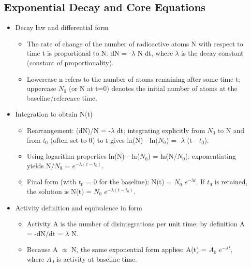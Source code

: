 \documentclass[11pt,a4paper]{article}
\let\originalsubsection\subsection
\renewcommand{\subsection}{\Needspace{8\baselineskip}\originalsubsection}
\begin{document}
\subsection{Exponential Decay and Core Equations}
\begin{itemize}
\item Decay law and differential form
\begin{itemize}
\item The rate of change of the number of radioactive atoms N with respect to time t is proportional to N: dN = -\ensuremath{\lambda} N dt, where \ensuremath{\lambda} is the decay constant (constant of proportionality).
\item Lowercase n refers to the number of atoms remaining after some time t; uppercase \(N_0\) (or N at t=0) denotes the initial number of atoms at the baseline/reference time.
\end{itemize}
\item Integration to obtain N(t)
\begin{itemize}
\item Rearrangement: (dN)/N = -\ensuremath{\lambda} dt; integrating explicitly from \(N_0\) to N and from \(t_0\) (often set to 0) to t gives ln(N) - ln(\(N_0\)) = -\ensuremath{\lambda} (t - \(t_0\)).
\item Using logarithm properties ln(N) - ln(\(N_0\)) = ln(N/\(N_0\)); exponentiating yields N/\(N_0\) = \(e^{-\lambda(t-t_0)}\).
\item Final form (with \(t_0\) = 0 for the baseline): N(t) = \(N_0\) \(e^{-\lambda t}\). If \(t_0\) is retained, the solution is N(t) = \(N_0\) \(e^{-\lambda(t-t_0)}\).
\end{itemize}
\item Activity definition and equivalence in form
\begin{itemize}
\item Activity A is the number of disintegrations per unit time; by definition A = -dN/dt = \ensuremath{\lambda} N.
\item Because A \ensuremath{\propto} N, the same exponential form applies: A(t) = \(A_0\) \(e^{-\lambda t}\), where \(A_0\) is activity at baseline time.
\end{itemize}
\end{itemize}
\end{document}
